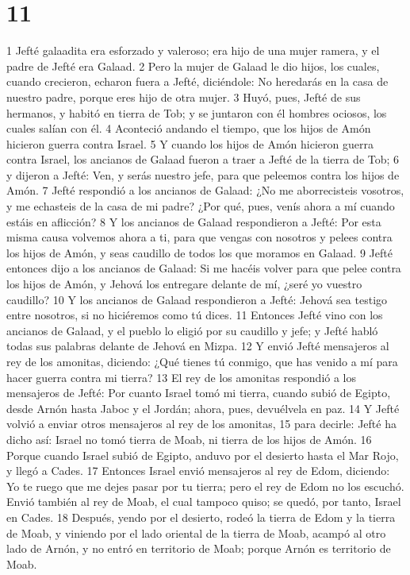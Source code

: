 \chapter{11}

1 Jefté galaadita era esforzado y valeroso; era hijo de una mujer ramera, y el padre de Jefté era Galaad.
2 Pero la mujer de Galaad le dio hijos, los cuales, cuando crecieron, echaron fuera a Jefté, diciéndole: No heredarás en la casa de nuestro padre, porque eres hijo de otra mujer.
3 Huyó, pues, Jefté de sus hermanos, y habitó en tierra de Tob; y se juntaron con él hombres ociosos, los cuales salían con él.
4 Aconteció andando el tiempo, que los hijos de Amón hicieron guerra contra Israel.
5 Y cuando los hijos de Amón hicieron guerra contra Israel, los ancianos de Galaad fueron a traer a Jefté de la tierra de Tob; 
6 y dijeron a Jefté: Ven, y serás nuestro jefe, para que peleemos contra los hijos de Amón.
7 Jefté respondió a los ancianos de Galaad: ¿No me aborrecisteis vosotros, y me echasteis de la casa de mi padre? ¿Por qué, pues, venís ahora a mí cuando estáis en aflicción?
8 Y los ancianos de Galaad respondieron a Jefté: Por esta misma causa volvemos ahora a ti, para que vengas con nosotros y pelees contra los hijos de Amón, y seas caudillo de todos los que moramos en Galaad.
9 Jefté entonces dijo a los ancianos de Galaad: Si me hacéis volver para que pelee contra los hijos de Amón, y Jehová los entregare delante de mí, ¿seré yo vuestro caudillo?
10 Y los ancianos de Galaad respondieron a Jefté: Jehová sea testigo entre nosotros, si no hiciéremos como tú dices.
11 Entonces Jefté vino con los ancianos de Galaad, y el pueblo lo eligió por su caudillo y jefe; y Jefté habló todas sus palabras delante de Jehová en Mizpa.
12 Y envió Jefté mensajeros al rey de los amonitas, diciendo: ¿Qué tienes tú conmigo, que has venido a mí para hacer guerra contra mi tierra?
13 El rey de los amonitas respondió a los mensajeros de Jefté: Por cuanto Israel tomó mi tierra, cuando subió de Egipto, desde Arnón hasta Jaboc y el Jordán; ahora, pues, devuélvela en paz.
14 Y Jefté volvió a enviar otros mensajeros al rey de los amonitas,
15 para decirle: Jefté ha dicho así: Israel no tomó tierra de Moab, ni tierra de los hijos de Amón.
16 Porque cuando Israel subió de Egipto, anduvo por el desierto hasta el Mar Rojo, y llegó a Cades.
17 Entonces Israel envió mensajeros al rey de Edom, diciendo: Yo te ruego que me dejes pasar por tu tierra; pero el rey de Edom no los escuchó. Envió también al rey de Moab, el cual tampoco quiso; se quedó, por tanto, Israel en Cades.
18 Después, yendo por el desierto, rodeó la tierra de Edom y la tierra de Moab, y viniendo por el lado oriental de la tierra de Moab, acampó al otro lado de Arnón, y no entró en territorio de Moab; porque Arnón es territorio de Moab.
